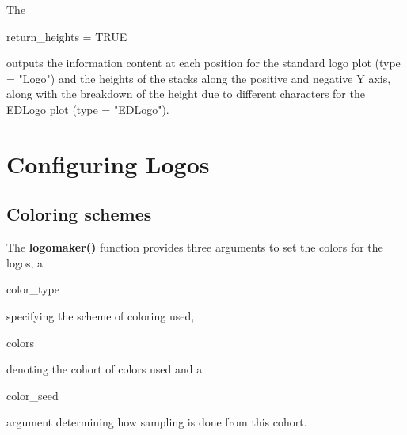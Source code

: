 \documentclass[12pt]{article}\usepackage[]{graphicx}\usepackage[usenames,dvipsnames]{color}
\begin{document}
The \begin{verb} return_heights = TRUE \end{verb} outputs the information content at each position for the standard logo plot (type = "Logo") and the heights of the stacks along the positive and negative Y axis, along
with the breakdown of the height due to different characters for the EDLogo plot (type = "EDLogo").

\clearpage

\section{Configuring Logos}

\subsection{Coloring schemes}

The \textbf{logomaker()} function provides three arguments to set the colors for the logos, a \begin{verb} color_type \end{verb} specifying the scheme of coloring used, \begin{verb} colors \end{verb} denoting the cohort of colors used and a \begin{verb} color_seed \end{verb} argument determining how sampling is done from this cohort.
\end{document}
